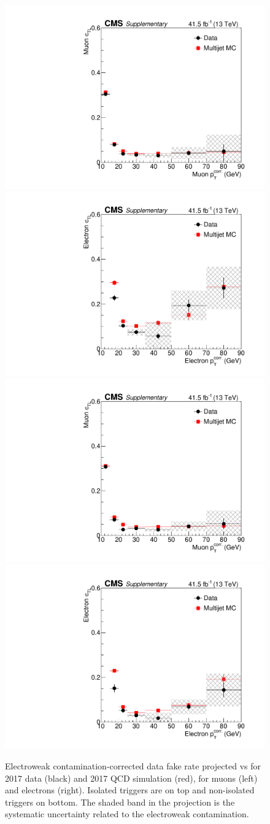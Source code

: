   \begin{figure}[!hbtp]
  \centering
  \includegraphics[width=.45\textwidth]{figs/ssan/fakerate/derivation/y2017/y2017_mu_1dfr_cone_LooseEMVA_IsoTrigs.pdf}
  \includegraphics[width=.45\textwidth]{figs/ssan/fakerate/derivation/y2017/y2017_el_1dfr_cone_LooseEMVA_IsoTrigs.pdf} \\
  \includegraphics[width=.45\textwidth]{figs/ssan/fakerate/derivation/y2017/y2017_mu_1dfr_cone_LooseEMVA.pdf}
  \includegraphics[width=.45\textwidth]{figs/ssan/fakerate/derivation/y2017/y2017_el_1dfr_cone_LooseEMVA.pdf}
  \caption{Electroweak contamination-corrected data fake rate projected vs \pt for 2017 data (black) and 2017 QCD simulation (red),
   for muons (left) and electrons (right). Isolated triggers are on top and non-isolated triggers on bottom.
      The shaded band in the projection is the systematic uncertainty related to the electroweak contamination.}
  \label{fig:QCDFRMuEle2017isoandnoniso}
  \end{figure}
